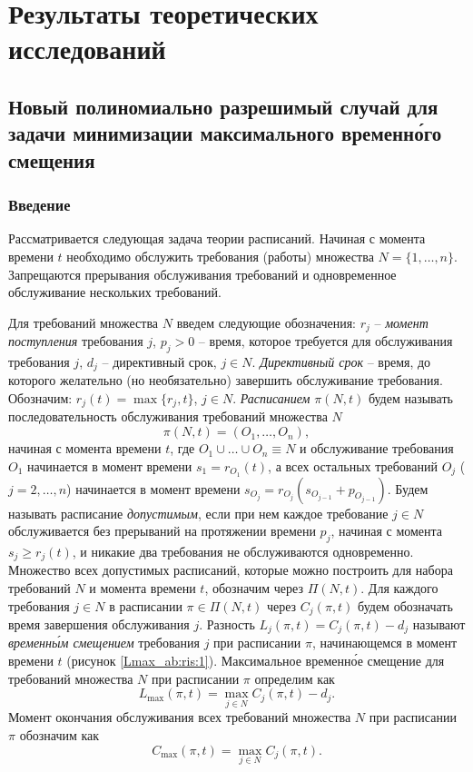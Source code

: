 \chapter{Результаты теоретических исследований} \label{chapt1}
\section{Новый полиномиально разрешимый случай для задачи минимизации максимального временн\'{о}го смещения} \label{Lmax_ab:sec:1}
\subsection{Введение}
Рассматривается следующая задача теории расписаний. Начиная с момента времени $t$ необходимо обслужить требования (работы) множества $N = \{1, \dots, n\}.$
Запрещаются прерывания обслуживания требований и одновременное обслуживание нескольких требований.

Для требований множества $N$ введем следующие обозначения: $r_j$ -- \textit{момент поступления} требования $j$, $p_j > 0$ -- время, которое требуется для обслуживания требования $j$, $d_j$ -- директивный срок, $j \in N$. \textit{Директивный срок} -- время, до которого желательно (но необязательно) завершить обслуживание требования. Обозначим: $r_j(t) = \max\{r_j, t\}$, $j \in N$. \textit{Расписанием} $\pi(N,t)$ будем называть последовательность обслуживания требований множества $N$ $$\pi(N,t) = (O_1, \dots, O_n),$$ начиная с момента времени $t$, где $O_1 \cup \dots \cup O_n \equiv N$ и обслуживание требования $O_1$ начинается в момент времени $s_1 = r_{O_1}(t)$, а всех остальных требований $O_j$ ($j=2, \dots, n$) начинается в момент времени $s_{O_j} = r_{O_j}(s_{O_{j-1}} + p_{O_{j-1}})$. Будем называть расписание \textit{допустимым}, если при нем каждое требование  $j \in N$ обслуживается без прерываний на протяжении времени $p_j$, начиная с момента $s_j \geq r_j(t)$, и никакие два требования не обслуживаются одновременно. Множество всех допустимых расписаний, которые можно построить для набора требований $N$ и момента времени $t$, обозначим через $\Pi(N, t)$.
Для каждого требования $j \in N$ в расписании $\pi \in \Pi(N,t)$ через $C_j(\pi, t)$ будем обозначать время завершения обслуживания $j$. Разность $L_j(\pi, t) = C_j(\pi, t) - d_j$ называют \textit{временн\'{ы}м смещением} требования $j$ при расписании $\pi$, начинающемся в момент времени $t$ (рисунок \ref{Lmax_ab:ris:1}). Максимальное временн\'{о}е смещение для требований множества $N$ при расписании $\pi$ определим как
$$L_{\max}(\pi,t) = \max\limits_{j \in N} C_j(\pi,t) - d_j.$$
Момент окончания обслуживания всех требований множества $N$ при расписании $\pi$ обозначим как
$$C_{\max}(\pi,t) = \max\limits_{j \in N} C_j(\pi,t).$$


